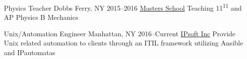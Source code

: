 \begin{cventries}
\cventry
    {Physics Teacher} %
    {Dobbs Ferry, NY} %
    {2015--2016}      %
    {\href{mastersny.org}{Masters School}} %
    {Teaching 11\textsuperscript{11} and AP Physics B Mechanics} %

\cventry
    {Unix/Automation Engineer} %
    {Manhattan, NY} %
    {2016--Current} %
    {\href{www.ipsoft.com}{IPsoft Inc}} %
    {Provide Unix related automation to clients through an ITIL framework utilizing Ansible and IPautomatas} %

\end{cventries}


